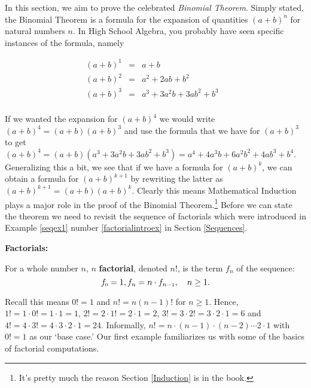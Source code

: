 

\setcounter{footnote}{0}

\label{Binomial}

In this section, we aim to prove the celebrated \textit{Binomial Theorem}.  Simply stated, the Binomial Theorem is a formula for the expansion of quantities $(a+b)^n$ for natural numbers $n$.  In High School Algebra, you probably have seen specific instances of the formula, namely

\[ \begin{array}{rclr}

(a+b)^1 & = & a + b & \\
(a+b)^2 & = & a^2 + 2ab + b^2 & \\
(a+b)^3 & = & a^3 + 3a^2 b + 3ab^2 + b^3 & \\
\end{array}\]

If we wanted the expansion for $(a+b)^4$ we would write $(a+b)^4 = (a+b)(a+b)^3$ and use the formula that we have for $(a+b)^3$ to get $(a+b)^4 = (a+b) \left( a^3 + 3a^2 b + 3ab^2 + b^3 \right) = a^4 + 4a^3b + 6a^2b^2 + 4ab^3 + b^4$.  Generalizing this a bit, we see that if we have a formula for $(a+b)^{k}$, we can obtain a formula for $(a+b)^{k+1}$ by rewriting the latter as $(a+b)^{k+1} = (a+b)(a+b)^{k}$.  Clearly this means Mathematical Induction plays a major role in the proof of the Binomial Theorem.\footnote{It's pretty much the reason Section \ref{Induction} is in the book.}  Before we can state the theorem we need to revisit the sequence of factorials which were introduced in Example \ref{seqex1} number \ref{factorialintroex} in Section \ref{Sequences}.

\medskip

\colorbox{ResultColor}{\bbm 

\begin{defn}  \label{factorialdefn}  \textbf{Factorials:}  

For a whole number $n$,  {\boldmath $n$} \textbf{factorial}, denoted $n!$,  is the term $f_{n}$ of the sequence: \[ f_{\mbox{\tiny$0$}} = 1, f_{n} =n \cdot f_{n-\mbox{\tiny$1$}}, \quad n \geq 1.\]


\end{defn}

\ebm}


\medskip

Recall this means $0! = 1$ and $n! = n(n-1)!$ for $n \geq 1$.  Hence, $1! = 1 \cdot 0! = 1 \cdot 1 = 1$, $2! = 2 \cdot 1! = 2 \cdot 1 = 2$, $3! = 3 \cdot 2! = 3 \cdot 2 \cdot 1 = 6$ and  $4! = 4 \cdot 3! = 4 \cdot 3 \cdot 2 \cdot 1 = 24$. Informally, $n! = n\cdot(n -1)\cdot(n -2) \cdots 2 \cdot 1$ with $0! = 1$ as our `base case.'  Our first example familiarizes us with some of the basics of factorial computations.

